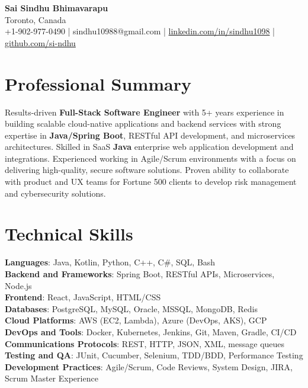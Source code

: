 \documentclass[letterpaper,11pt]{article}
\begin{document}
\begin{center}
  {\Large \textbf{Sai Sindhu Bhimavarapu}} \\
  Toronto, Canada \\
  +1-902-977-0490 \enspace | \enspace sindhu10988@gmail.com \enspace | \enspace \href{https://www.linkedin.com/in/sindhu1098/}{linkedin.com/in/sindhu1098} \enspace | \enspace \href{https://github.com/si-ndhu}{github.com/si-ndhu}
\end{center}

\section{Professional Summary}
  \begin{itemize}[leftmargin=0.15in, label={}]
    \small{\item{
     Results-driven \textbf{Full-Stack Software Engineer} with 5+ years experience in building scalable cloud-native applications and backend services with strong expertise in \textbf{Java/Spring Boot}, RESTful API development, and microservices architectures. Skilled in SaaS \textbf{Java} enterprise web application development and integrations. Experienced working in Agile/Scrum environments with a focus on delivering high-quality, secure software solutions. Proven ability to collaborate with product and UX teams for Fortune 500 clients to develop risk management and cybersecurity solutions.
    }}
  \end{itemize}
\vspace{-16pt}

\section{Technical Skills}
 \begin{itemize}[leftmargin=0.15in, label={}]
    \small{\item{
     \textbf{Languages}: Java, Kotlin, Python, C++, C\#, SQL, Bash \\
     \textbf{Backend and Frameworks}: Spring Boot, RESTful APIs, Microservices, Node.js \\
     \textbf{Frontend}: React, JavaScript, HTML/CSS \\
     \textbf{Databases}: PostgreSQL, MySQL, Oracle, MSSQL, MongoDB, Redis \\
     \textbf{Cloud Platforms}: AWS (EC2, Lambda), Azure (DevOps, AKS), GCP \\
     \textbf{DevOps and Tools}: Docker, Kubernetes, Jenkins, Git, Maven, Gradle, CI/CD \\
     \textbf{Communications Protocols}: REST, HTTP, JSON, XML, message queues \\
     \textbf{Testing and QA}: JUnit, Cucumber, Selenium, TDD/BDD, Performance Testing \\
     \textbf{Development Practices}: Agile/Scrum, Code Reviews, System Design, JIRA, Scrum Master Experience
    }}
 \end{itemize}
\vspace{-16pt}
\end{document}
